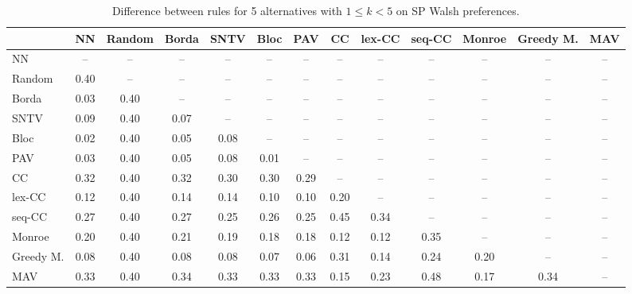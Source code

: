 
\begin{table*}[htbp]
\centering
\begin{tabular}{lcccccccccccc}
\toprule
 & NN & Random & Borda & SNTV & Bloc & PAV & CC & lex-CC & seq-CC & Monroe & Greedy M. & MAV \\
\midrule
NN & -- & -- & -- & -- & -- & -- & -- & -- & -- & -- & -- & -- \\
Random & \cellcolor{blue!40} 0.40 & -- & -- & -- & -- & -- & -- & -- & -- & -- & -- & -- \\
Borda & \cellcolor{blue!3} 0.03 & \cellcolor{blue!40} 0.40 & -- & -- & -- & -- & -- & -- & -- & -- & -- & -- \\
SNTV & \cellcolor{blue!9} 0.09 & \cellcolor{blue!40} 0.40 & \cellcolor{blue!7} 0.07 & -- & -- & -- & -- & -- & -- & -- & -- & -- \\
Bloc & \cellcolor{blue!2} 0.02 & \cellcolor{blue!40} 0.40 & \cellcolor{blue!5} 0.05 & \cellcolor{blue!8} 0.08 & -- & -- & -- & -- & -- & -- & -- & -- \\
PAV & \cellcolor{blue!3} 0.03 & \cellcolor{blue!40} 0.40 & \cellcolor{blue!5} 0.05 & \cellcolor{blue!8} 0.08 & \cellcolor{blue!1} 0.01 & -- & -- & -- & -- & -- & -- & -- \\
CC & \cellcolor{blue!32} 0.32 & \cellcolor{blue!40} 0.40 & \cellcolor{blue!32} 0.32 & \cellcolor{blue!30} 0.30 & \cellcolor{blue!30} 0.30 & \cellcolor{blue!28} 0.29 & -- & -- & -- & -- & -- & -- \\
lex-CC & \cellcolor{blue!12} 0.12 & \cellcolor{blue!40} 0.40 & \cellcolor{blue!14} 0.14 & \cellcolor{blue!14} 0.14 & \cellcolor{blue!10} 0.10 & \cellcolor{blue!10} 0.10 & \cellcolor{blue!20} 0.20 & -- & -- & -- & -- & -- \\
seq-CC & \cellcolor{blue!27} 0.27 & \cellcolor{blue!40} 0.40 & \cellcolor{blue!27} 0.27 & \cellcolor{blue!25} 0.25 & \cellcolor{blue!26} 0.26 & \cellcolor{blue!25} 0.25 & \cellcolor{blue!45} 0.45 & \cellcolor{blue!34} 0.34 & -- & -- & -- & -- \\
Monroe & \cellcolor{blue!20} 0.20 & \cellcolor{blue!40} 0.40 & \cellcolor{blue!21} 0.21 & \cellcolor{blue!19} 0.19 & \cellcolor{blue!18} 0.18 & \cellcolor{blue!18} 0.18 & \cellcolor{blue!12} 0.12 & \cellcolor{blue!12} 0.12 & \cellcolor{blue!35} 0.35 & -- & -- & -- \\
Greedy M. & \cellcolor{blue!8} 0.08 & \cellcolor{blue!40} 0.40 & \cellcolor{blue!8} 0.08 & \cellcolor{blue!8} 0.08 & \cellcolor{blue!7} 0.07 & \cellcolor{blue!6} 0.06 & \cellcolor{blue!31} 0.31 & \cellcolor{blue!14} 0.14 & \cellcolor{blue!24} 0.24 & \cellcolor{blue!20} 0.20 & -- & -- \\
MAV & \cellcolor{blue!33} 0.33 & \cellcolor{blue!40} 0.40 & \cellcolor{blue!34} 0.34 & \cellcolor{blue!33} 0.33 & \cellcolor{blue!33} 0.33 & \cellcolor{blue!33} 0.33 & \cellcolor{blue!15} 0.15 & \cellcolor{blue!23} 0.23 & \cellcolor{blue!48} 0.48 & \cellcolor{blue!17} 0.17 & \cellcolor{blue!34} 0.34 & -- \\
\bottomrule
\end{tabular}

\caption{Difference between rules for 5 alternatives with $1 \leq k < 5$ on SP Walsh preferences.}
\label{tab:rule_distance_heatmap-m=[5]-pref_dist=single_peaked_walsh}
\end{table*}
    